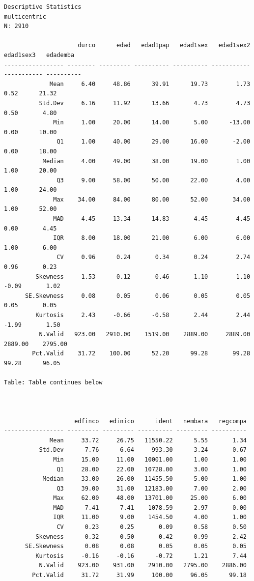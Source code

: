 \documentclass[
]{book}
\begin{document}
\begin{verbatim}
Descriptive Statistics  
multicentric  
N: 2910  

                     durco      edad   edad1pap   edad1sex   edad1sex2   edad1sex3   edademba
----------------- -------- --------- ---------- ---------- ----------- ----------- ----------
             Mean     6.40     48.86      39.91      19.73        1.73        0.52      21.32
          Std.Dev     6.16     11.92      13.66       4.73        4.73        0.50       4.80
              Min     1.00     20.00      14.00       5.00      -13.00        0.00      10.00
               Q1     1.00     40.00      29.00      16.00       -2.00        0.00      18.00
           Median     4.00     49.00      38.00      19.00        1.00        1.00      20.00
               Q3     9.00     58.00      50.00      22.00        4.00        1.00      24.00
              Max    34.00     84.00      80.00      52.00       34.00        1.00      52.00
              MAD     4.45     13.34      14.83       4.45        4.45        0.00       4.45
              IQR     8.00     18.00      21.00       6.00        6.00        1.00       6.00
               CV     0.96      0.24       0.34       0.24        2.74        0.96       0.23
         Skewness     1.53      0.12       0.46       1.10        1.10       -0.09       1.02
      SE.Skewness     0.08      0.05       0.06       0.05        0.05        0.05       0.05
         Kurtosis     2.43     -0.66      -0.58       2.44        2.44       -1.99       1.50
          N.Valid   923.00   2910.00    1519.00    2889.00     2889.00     2889.00    2795.00
        Pct.Valid    31.72    100.00      52.20      99.28       99.28       99.28      96.05

Table: Table continues below

 

                    edfinco   edinico      ident   nembara   regcompa
----------------- --------- --------- ---------- --------- ----------
             Mean     33.72     26.75   11550.22      5.55       1.34
          Std.Dev      7.76      6.64     993.30      3.24       0.67
              Min     15.00     11.00   10001.00      1.00       1.00
               Q1     28.00     22.00   10728.00      3.00       1.00
           Median     33.00     26.00   11455.50      5.00       1.00
               Q3     39.00     31.00   12183.00      7.00       2.00
              Max     62.00     48.00   13701.00     25.00       6.00
              MAD      7.41      7.41    1078.59      2.97       0.00
              IQR     11.00      9.00    1454.50      4.00       1.00
               CV      0.23      0.25       0.09      0.58       0.50
         Skewness      0.32      0.50       0.42      0.99       2.42
      SE.Skewness      0.08      0.08       0.05      0.05       0.05
         Kurtosis     -0.16     -0.16      -0.72      1.21       7.44
          N.Valid    923.00    931.00    2910.00   2795.00    2886.00
        Pct.Valid     31.72     31.99     100.00     96.05      99.18
\end{verbatim}
\end{document}
